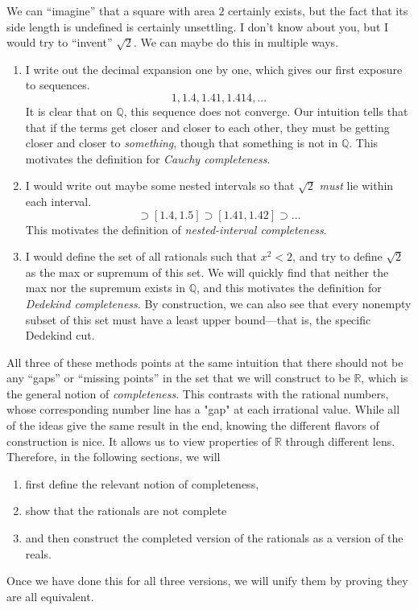   We can ``imagine'' that a square with area $2$ certainly exists, but the fact that its side length is undefined is certainly unsettling. I don't know about you, but I would try to ``invent'' $\sqrt{2}$. We can maybe do this in multiple ways. 
  \begin{enumerate}
    \item I write out the decimal expansion one by one, which gives our first exposure to sequences. 
    \begin{equation}
      1, 1.4, 1.41, 1.414, \ldots
    \end{equation} 
    It is clear that on $\mathbb{Q}$, this sequence does not converge. Our intuition tells that that if the terms get closer and closer to each other, they must be getting closer and closer to \textit{something}, though that something is not in $\mathbb{Q}$. This motivates the definition for \textit{Cauchy completeness}. 

    \item I would write out maybe some nested intervals so that $\sqrt{2}$ \textit{must} lie within each interval. 
    \begin{equation}
      [1, 2] \supset [1.4, 1.5] \supset [1.41, 1.42] \supset \ldots 
    \end{equation}
    This motivates the definition of \textit{nested-interval completeness}. 

    \item I would define the set of all rationals such that $x^2 < 2$, and try to define $\sqrt{2}$ as the max or supremum of this set. We will quickly find that neither the max nor the supremum exists in $\mathbb{Q}$, and this motivates the definition for \textit{Dedekind completeness}. By construction, we can also see that every nonempty subset of this set must have a least upper bound---that is, the specific Dedekind cut.  
  \end{enumerate}

  All three of these methods points at the same intuition that there should not be any ``gaps'' or ``missing points'' in the set that we will construct to be $\mathbb{R}$, which is the general notion of \textit{completeness}. This contrasts with the rational numbers, whose corresponding number line has a "gap" at each irrational value. While all of the ideas give the same result in the end, knowing the different flavors of construction is nice. It allows us to view properties of $\mathbb{R}$ through different lens. Therefore, in the following sections, we will 
  \begin{enumerate}
    \item first define the relevant notion of completeness, 
    \item show that the rationals are not complete 
    \item and then construct the completed version of the rationals as a version of the reals. 
  \end{enumerate}
  Once we have done this for all three versions, we will unify them by proving they are all equivalent. 

